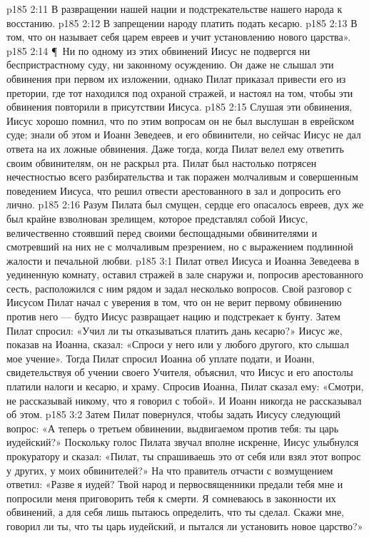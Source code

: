 \vs p185 2:11 \bibnobreakspace В развращении нашей нации и подстрекательстве нашего народа к восстанию.
\vs p185 2:12 \bibnobreakspace В запрещении народу платить подать кесарю.
\vs p185 2:13 \bibnobreakspace В том, что он называет себя царем евреев и учит установлению нового царства».
\vs p185 2:14 \P\ Ни по одному из этих обвинений Иисус не подвергся ни беспристрастному суду, ни законному осуждению. Он даже не слышал эти обвинения при первом их изложении, однако Пилат приказал привести его из претории, где тот находился под охраной стражей, и настоял на том, чтобы эти обвинения повторили в присутствии Иисуса.
\vs p185 2:15 Слушая эти обвинения, Иисус хорошо помнил, что по этим вопросам он не был выслушан в еврейском суде; знали об этом и Иоанн Зеведеев, и его обвинители, но сейчас Иисус не дал ответа на их ложные обвинения. Даже тогда, когда Пилат велел ему ответить своим обвинителям, он не раскрыл рта. Пилат был настолько потрясен нечестностью всего разбирательства и так поражен молчаливым и совершенным поведением Иисуса, что решил отвести арестованного в зал и допросить его лично.
\vs p185 2:16 Разум Пилата был смущен, сердце его опасалось евреев, дух же был крайне взволнован зрелищем, которое представлял собой Иисус, величественно стоявший перед своими беспощадными обвинителями и смотревший на них не с молчаливым презрением, но с выражением подлинной жалости и печальной любви.
\vs p185 3:1 Пилат отвел Иисуса и Иоанна Зеведеева в уединенную комнату, оставил стражей в зале снаружи и, попросив арестованного сесть, расположился с ним рядом и задал несколько вопросов. Свой разговор с Иисусом Пилат начал с уверения в том, что он не верит первому обвинению против него --- будто Иисус развращает нацию и подстрекает к бунту. Затем Пилат спросил: «Учил ли ты отказываться платить дань кесарю?» Иисус же, показав на Иоанна, сказал: «Спроси у него или у любого другого, кто слышал мое учение». Тогда Пилат спросил Иоанна об уплате подати, и Иоанн, свидетельствуя об учении своего Учителя, объяснил, что Иисус и его апостолы платили налоги и кесарю, и храму. Спросив Иоанна, Пилат сказал ему: «Смотри, не рассказывай никому, что я говорил с тобой». И Иоанн никогда не рассказывал об этом.
\vs p185 3:2 Затем Пилат повернулся, чтобы задать Иисусу следующий вопрос: «А теперь о третьем обвинении, выдвигаемом против тебя: ты царь иудейский?» Поскольку голос Пилата звучал вполне искренне, Иисус улыбнулся прокуратору и сказал: «Пилат, ты спрашиваешь это от себя или взял этот вопрос у других, у моих обвинителей?» На что правитель отчасти с возмущением ответил: «Разве я иудей? Твой народ и первосвященники предали тебя мне и попросили меня приговорить тебя к смерти. Я сомневаюсь в законности их обвинений, а для себя лишь пытаюсь определить, что ты сделал. Скажи мне, говорил ли ты, что ты царь иудейский, и пытался ли установить новое царство?»
